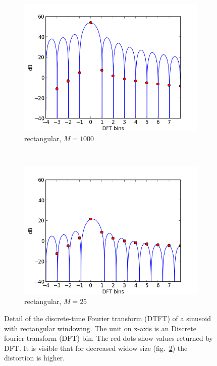 \begin{figure}[h!]%
  \centering
        \begin{subfigure}[b]{0.5\textwidth}
                \centering
                \includegraphics[width=\textwidth]{img/leakage_rect_1000}
                \caption{rectangular, $M=1000$}
                \label{fig:leakage_rect_1000}
        \end{subfigure}%
        ~ \begin{subfigure}[b]{0.5\textwidth}
                \centering
                \includegraphics[width=\textwidth]{img/leakage_rect_25}
                \caption{rectangular, $M=25$}
                \label{fig:leakage_rect_25}
        \end{subfigure}%
  \caption{\small Detail of the discrete-time Fourier transform (DTFT) of a sinusoid 
  with rectangular  windowing.
  The unit on x-axis is an Discrete fourier transform (DFT) bin.
  The red dots show values returned by DFT. It is visible that for decreased widow
   size (fig.~\ref{fig:leakage_rect_25}) the distortion is higher.}
  \label{fig:leakage_rect}
\end{figure}


